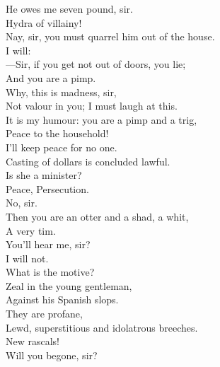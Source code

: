 \documentclass[a4paper,oneside,12pt]{memoir}
\begin{document}
\begin{drama*}
\druggerspeaks He owes me seven pound, sir.\\
\surlyspeaks {} Hydra of villainy!\\
\facespeaks Nay, sir, you must quarrel him out of the house.\\
\kastrilspeaks {} I will:\\
---Sir, if you get not out of doors, you lie;\\
And you are a pimp.\\
\surlyspeaks {} Why, this is madness, sir,\\
Not valour in you; I must laugh at this.\\
\kastrilspeaks It is my humour: you are a pimp and a trig,\\
\persecutionspeaks Peace to the household!\\
\kastrilspeaks {} I'll keep peace for no one.\\
\persecutionspeaks Casting of dollars is concluded lawful.\\
\kastrilspeaks Is she a minister?\\
\subtlespeaks {} Peace, Persecution.\\
\facespeaks No, sir.\\
\kastrilspeaks {} Then you are an otter and a shad, a whit,\\
A very tim.\\
\surlyspeaks {} You'll hear me, sir?\\
\kastrilspeaks {} I will not.\\
\persecutionspeaks What is the motive?\\
\subtlespeaks {} Zeal in the young gentleman,\\
Against his Spanish slops.\\
\persecutionspeaks {} They are profane,\\
Lewd, superstitious and idolatrous breeches.\\
\surlyspeaks New rascals!\\
\kastrilspeaks {} Will you begone, sir?\\

\end{drama*}
\end{document}
